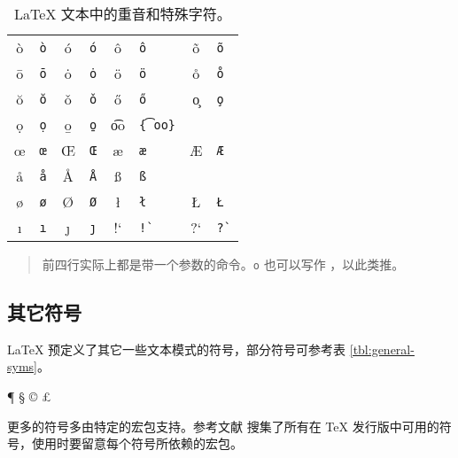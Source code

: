\def\TSYM #1{#1       & \texttt{\string#1}}
\def\TACC #1#2{#1{#2} & \texttt{\string#1#2}}       %
\def\TTACC #1#2{#1{#2} & \texttt{\string#1 #2}}     %
\def\WTACC #1#2{#1{#2} & \texttt{\string#1\{#2\}}}  %
\begin{table}[htp]
\centering
\caption{\LaTeX{} 文本中的重音和特殊字符。} \label{tbl:accents}
\begin{tabular}{*4{cl}}
 \hline
 \TACC{\`}{o} & \TACC{\'}{o} & \TACC{\^}{o} & \TACC{\~}{o} \\
 \TACC{\=}{o} & \TACC{\.}{o} & \TACC{\"}{o} & \TTACC{\r}{o}\\
 \TTACC{\u}{o} & \TTACC{\v}{o} & \TTACC{\H}{o} & \TTACC{\c}{o} \\
 \TTACC{\d}{o} & \TTACC{\b}{o} & \WTACC{\t}{oo} \\[6pt]
 \TSYM{\oe} & \TSYM{\OE} & \TSYM{\ae} & \TSYM{\AE} \\
 \TSYM{\aa} & \TSYM{\AA} & \TSYM{\ss} \\[6pt]
 \TSYM{\o}  & \TSYM{\O}  & \TSYM{\l} & \TSYM{\L} \\
 \TSYM{\i}  & \TSYM{\j}  & !` & \verb|!`| & ?` & \verb|?`| \\
 \hline
\end{tabular}
\begin{quote}\footnotesize%
前四行实际上都是带一个参数的命令。\cmd{\textasciicircum}\texttt{o} 也可以写作
\cmd{\textasciicircum}，以此类推。
\end{quote}
\end{table}

\subsection{其它符号}\label{subsec:text-misc}

\LaTeX{} 预定义了其它一些文本模式的符号，部分符号可参考表 \ref{tbl:general-syms}。
\begin{example}
\P{} \S{} \dag{} \ddag{}
\copyright{} \pounds{}

\textasteriskcentered
\textperiodcentered
\textbullet

\textregistered{} \texttrademark
\end{example}

更多的符号多由特定的宏包支持。参考文献 \cite{symbols} 搜集了所有在 \TeX{} 发行版中可用的符号，使用时要留意每个符号所依赖的宏包。

